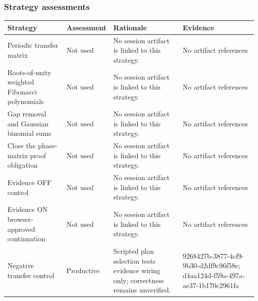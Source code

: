 \documentclass[11pt]{article}
\begin{document}
\subsubsection*{Strategy assessments}
\begin{longtable}{>{\raggedright\arraybackslash}p{.16\linewidth}>{\raggedright\arraybackslash}p{.15\linewidth}>{\raggedright\arraybackslash}p{.40\linewidth}>{\raggedright\arraybackslash}p{.17\linewidth}}
\toprule Strategy & Assessment & Rationale & Evidence \\
\midrule\endhead
Periodic transfer matrix & Not used & No session artifact is linked to this strategy. & No artifact references \\
Roots-of-unity weighted Fibonacci polynomials & Not used & No session artifact is linked to this strategy. & No artifact references \\
Gap removal and Gaussian binomial sums & Not used & No session artifact is linked to this strategy. & No artifact references \\
Close the phase-matrix proof obligation & Not used & No session artifact is linked to this strategy. & No artifact references \\
Evidence OFF control & Not used & No session artifact is linked to this strategy. & No artifact references \\
Evidence ON browser-approved continuation & Not used & No session artifact is linked to this strategy. & No artifact references \\
Negative transfer control & Productive & Scripted plan selection tests evidence wiring only; correctness remains unverified. & 9268427b-3877-4cf9-9b30-d2df9c96f58e; d4aa124d-f59a-497a-ae37-1b170c2961fa \\
\bottomrule
\end{longtable}
\end{document}
